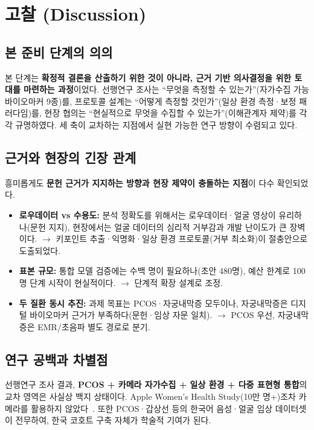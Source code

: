 \documentclass[11pt,a4paper]{article}
\begin{document}
\section{고찰 (Discussion)}

\subsection{본 준비 단계의 의의}
본 단계는 \textbf{확정적 결론을 산출하기 위한 것이 아니라, 근거 기반 의사결정을 위한 토대를 마련하는 과정}이었다. 선행연구 조사는 ``무엇을 측정할 수 있는가''(자가수집 가능 바이오마커 9종)를, 프로토콜 설계는 ``어떻게 측정할 것인가''(일상 환경 측정·보정 패러다임)를, 현장 협의는 ``현실적으로 무엇을 수집할 수 있는가''(이해관계자 제약)를 각각 규명하였다. 세 축이 교차하는 지점에서 실현 가능한 연구 방향이 수렴되고 있다.

\subsection{근거와 현장의 긴장 관계}
흥미롭게도 \textbf{문헌 근거가 지지하는 방향과 현장 제약이 충돌하는 지점}이 다수 확인되었다.
\begin{itemize}
  \item \textbf{로우데이터 vs 수용도:} 분석 정확도를 위해서는 로우데이터·얼굴 영상이 유리하나(문헌 지지), 현장에서는 얼굴 데이터의 심리적 거부감과 개발 난이도가 큰 장벽이다. $\rightarrow$ 키포인트 추출·익명화·일상 환경 프로토콜(거부 최소화)이 절충안으로 도출되었다.
  \item \textbf{표본 규모:} 통합 모델 검증에는 수백 명이 필요하나(초안 480명), 예산 한계로 100명 단계 시작이 현실적이다. $\rightarrow$ 단계적 확장 설계로 조정.
  \item \textbf{두 질환 동시 추진:} 과제 목표는 PCOS·자궁내막증 모두이나, 자궁내막증은 디지털 바이오마커 근거가 부족하다(문헌·임상 자문 일치). $\rightarrow$ PCOS 우선, 자궁내막증은 EMR/초음파 별도 경로로 분기.
\end{itemize}

\subsection{연구 공백과 차별점}
선행연구 조사 결과, \textbf{PCOS + 카메라 자가수집 + 일상 환경 + 다중 표현형 통합}의 교차 영역은 사실상 백지 상태이다. Apple Women's Health Study(10만 명+)조차 카메라를 활용하지 않았다~\cite{ref13}. 또한 PCOS·갑상선 등의 한국어 음성·얼굴 임상 데이터셋이 전무하여, 한국 코호트 구축 자체가 학술적 기여가 된다.
\end{document}

